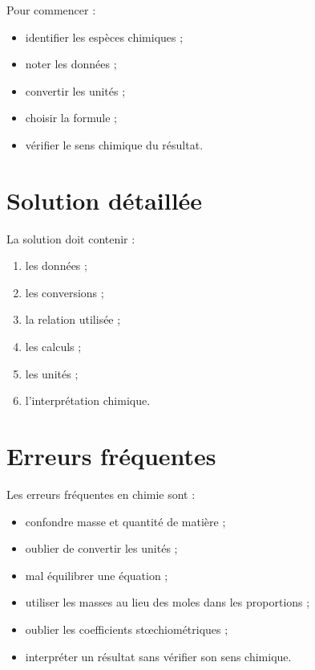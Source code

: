 \documentclass[11pt,a4paper]{article}
\begin{document}
\begin{cadreaide}
Pour commencer :
\begin{itemize}
    \item identifier les espèces chimiques ;
    \item noter les données ;
    \item convertir les unités ;
    \item choisir la formule ;
    \item vérifier le sens chimique du résultat.
\end{itemize}
\end{cadreaide}

\section{Solution détaillée}

\begin{cadresolution}
La solution doit contenir :
\begin{enumerate}
    \item les données ;
    \item les conversions ;
    \item la relation utilisée ;
    \item les calculs ;
    \item les unités ;
    \item l’interprétation chimique.
\end{enumerate}
\end{cadresolution}

\section{Erreurs fréquentes}

\begin{cadreattention}
Les erreurs fréquentes en chimie sont :
\begin{itemize}
    \item confondre masse et quantité de matière ;
    \item oublier de convertir les unités ;
    \item mal équilibrer une équation ;
    \item utiliser les masses au lieu des moles dans les proportions ;
    \item oublier les coefficients stœchiométriques ;
    \item interpréter un résultat sans vérifier son sens chimique.
\end{itemize}
\end{cadreattention}
\end{document}
